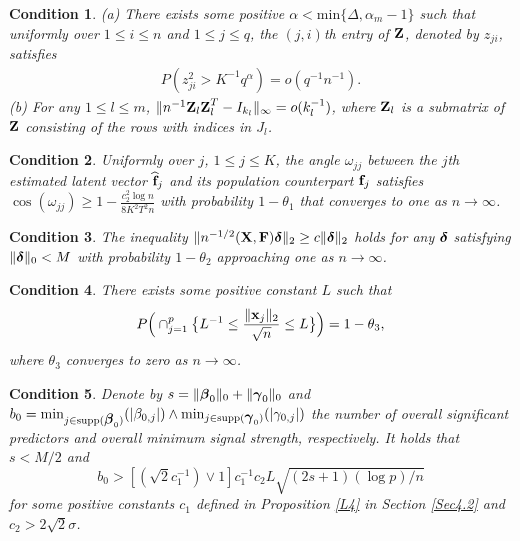 \documentclass{statsoc}
\newtheorem{condition}{Condition}%
\newcommand{\bff}{\mbox{\bf f}}
\newcommand{\bx}{\mbox{\bf x}}
\newcommand{\bF}{\mbox{\bf F}}
\newcommand{\bX}{\mbox{\bf X}}
\newcommand{\bZ}{\mbox{\bf Z}}
\newcommand{\bbeta}{\mbox{\boldmath $\beta$}}
\newcommand{\bdelta}{\mbox{\boldmath $\delta$}}
\newcommand{\bgamma}{\mbox{\boldmath $\gamma$}}
\newcommand{\supp}{\mathrm{supp}}
\def\t{^T}
\begin{document}
\begin{condition} \label{tailpb}
(a) There exists some positive $\alpha < \mbox{min}\{\Delta, \alpha_m - 1\}$ such that uniformly over $1 \leq i \leq n$ and $1 \leq j \leq q$, the $(j,i)$th entry of $\bZ$, denoted by $z_{ji}$, satisfies
\begin{align*}
P(z_{ji}^2 > K^{-1} q^{\alpha}) = o(q^{-1} n^{-1}).
\end{align*}
(b) For any $1 \leq l \leq m$, $\|n^{-1} \bZ_l \bZ_l\t - I_{k_l}\|_{\infty} = o(k_l^{-1})$, where $\bZ_l$ is a submatrix of $\bZ$ consisting of the rows with indices in $J_l$.
\end{condition}%

\begin{condition} \label{cond3}
Uniformly over $j$, $1 \leq j \leq K$, the angle $\omega_{jj}$ between the $j$th estimated latent vector $\widehat{\bff}_j$ and its population counterpart $\bff_j$ satisfies $\cos (\omega_{jj}) \geq 1 - \frac{c_2^2 \log n}{8 K^2 T^2 n}$ with probability $1 - \theta_1$ that converges to one as $n \to \infty$.
\end{condition}


\begin{condition} \label{robXZ}
The inequality $\|n^{-1/2}(\bX, \bF) \bdelta\|_2 \geq c \|\bdelta\|_2$ holds for any $\bdelta$ satisfying $\|\bdelta\|_0 < M$ with probability $1 - \theta_2$ approaching one as $n \to \infty$.
\end{condition}

\begin{condition} \label{condx}
There exists some positive constant $L$ such that
\[P\Big(\cap_{j = 1}^p \big\{L^{-1} \leq \frac{\|\bx_j\|_2}{\sqrt{n}} \leq L\big\}\Big) = 1 - \theta_3,\]
where $\theta_3$ converges to zero as $n \rightarrow \infty$.
\end{condition}

\begin{condition} \label{cond2}
Denote by $s = \|\bbeta_0\|_0 + \|\bgamma_0\|_0$ and $b_0 = \min_{j \in \supp(\bbeta_0)}(|\beta_{0,j}|) \wedge \min_{j \in \supp(\bgamma_0)}(|\gamma_{0,j}|)$ the number of overall significant predictors and overall minimum signal strength, respectively. It holds that $s < M/2$ and
\[b_0 > [(\sqrt{2}c_1^{-1}) \vee 1] c_1^{-1}c_2 L \sqrt{(2s + 1) (\log p)/n}\]
for some positive constants $c_1$ defined in Proposition \ref{L4} in Section \ref{Sec4.2} and $c_2 > 2\sqrt{2}\sigma$.
\end{condition}
\end{document}
